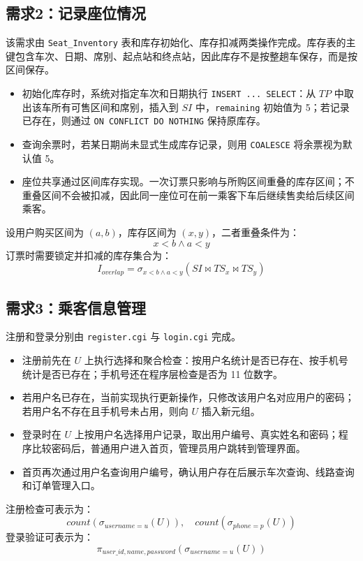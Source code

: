 \documentclass[10pt,a4paper]{article}
\begin{document}
\subsection{需求2：记录座位情况}

该需求由 \texttt{Seat\_Inventory} 表和库存初始化、库存扣减两类操作完成。库存表的主键包含车次、日期、席别、起点站和终点站，因此库存不是按整趟车保存，而是按区间保存。

\begin{itemize}
    \item 初始化库存时，系统对指定车次和日期执行 \texttt{INSERT ... SELECT}：从 $TP$ 中取出该车所有可售区间和席别，插入到 $SI$ 中，\texttt{remaining} 初始值为 5；若记录已存在，则通过 \texttt{ON CONFLICT DO NOTHING} 保持原库存。
    \item 查询余票时，若某日期尚未显式生成库存记录，则用 \texttt{COALESCE} 将余票视为默认值 5。
    \item 座位共享通过区间库存实现。一次订票只影响与所购区间重叠的库存区间；不重叠区间不会被扣减，因此同一座位可在前一乘客下车后继续售卖给后续区间乘客。
\end{itemize}

设用户购买区间为 $(a,b)$，库存区间为 $(x,y)$，二者重叠条件为：
\[
x < b \land a < y
\]
订票时需要锁定并扣减的库存集合为：
\[
I_{overlap}=\sigma_{x<b \land a<y}(SI \bowtie TS_x \bowtie TS_y)
\]

\subsection{需求3：乘客信息管理}

注册和登录分别由 \texttt{register.cgi} 与 \texttt{login.cgi} 完成。

\begin{itemize}
    \item 注册前先在 $U$ 上执行选择和聚合检查：按用户名统计是否已存在、按手机号统计是否已存在；手机号还在程序层检查是否为 11 位数字。
    \item 若用户名已存在，当前实现执行更新操作，只修改该用户名对应用户的密码；若用户名不存在且手机号未占用，则向 $U$ 插入新元组。
    \item 登录时在 $U$ 上按用户名选择用户记录，取出用户编号、真实姓名和密码；程序比较密码后，普通用户进入首页，管理员用户跳转到管理界面。
    \item 首页再次通过用户名查询用户编号，确认用户存在后展示车次查询、线路查询和订单管理入口。
\end{itemize}

注册检查可表示为：
\[
count(\sigma_{username=u}(U)),\quad count(\sigma_{phone=p}(U))
\]
登录验证可表示为：
\[
\pi_{user\_id,name,password}(\sigma_{username=u}(U))
\]
\end{document}
